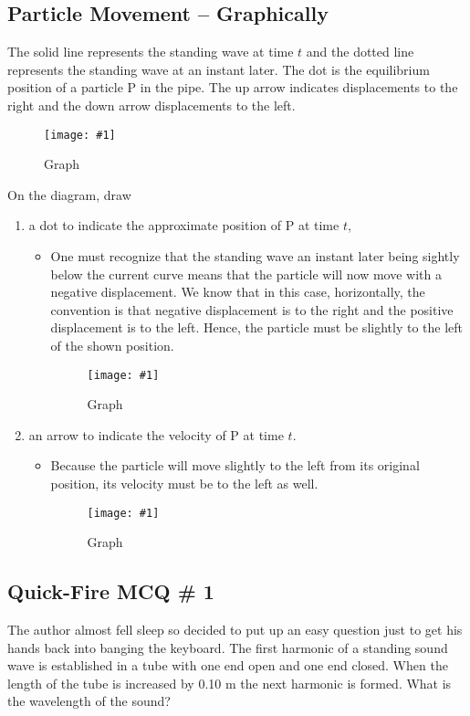 \documentclass[a4paper,12pt]{article}
\newcommand{\img}[4]{\begin{center}
  \begin{figure}[H]
    \centering
    \texttt{[image: \#1]}
    \caption{#3}
    \label{fig:#4}
  \end{figure}
\end{center}}
\begin{document}
\pagebreak

\subsection{Particle Movement -- Graphically}

The solid line represents the standing wave at time $t$ and the dotted line represents the standing wave at an instant later. The dot is the equilibrium position of a particle P in the pipe. The up arrow indicates displacements to the right and the down arrow displacements to the left.

\img{ex/2.png}{0.8}{Graph}{particle}

On the diagram, draw
\begin{enumerate}[label=(\alph*)]
  \item a dot to indicate the approximate position of P at time $t$,
        \begin{itemize}
          \item One must recognize that the standing wave an instant later being sightly below the current curve means that the particle will now move with a negative displacement. We know that in this case, horizontally, the convention is that negative displacement is to the right and the positive displacement is to the left. Hence, the particle must be slightly to the left of the shown position.
                \img{ex/3.png}{0.6}{Graph}{particle}
        \end{itemize}
  \item an arrow to indicate the velocity of P at time $t$.
        \begin{itemize}
          \item Because the particle will move slightly to the left from its original position, its velocity must be to the left as well.
                \img{ex/4.png}{0.6}{Graph}{particle}
        \end{itemize}
\end{enumerate}

\pagebreak

\subsection{Quick-Fire MCQ \# 1}

The author almost fell sleep so decided to put up an easy question just to get his hands back into banging the keyboard. The first harmonic of a standing sound wave is established in a tube with one end open and one end closed. When the length of the tube is increased by 0.10 m the next harmonic is formed. What is the wavelength of the sound?
\end{document}
